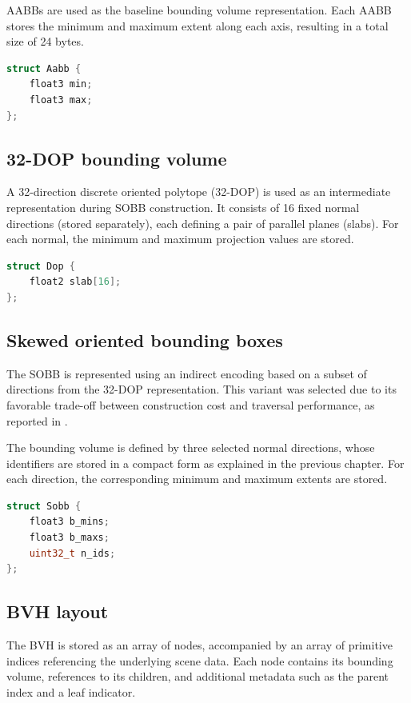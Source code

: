 AABBs are used as the baseline bounding volume representation. Each AABB stores the minimum and maximum extent along each axis, resulting in a total size of 24 bytes.

\begin{lstlisting}[language=C++, caption=AABB representation]
struct Aabb {
    float3 min;
    float3 max;
};
\end{lstlisting}

\subsection{32-DOP bounding volume}

A 32-direction discrete oriented polytope (32-DOP) is used as an intermediate representation during SOBB construction. It consists of 16 fixed normal directions (stored separately), each defining a pair of parallel planes (slabs). For each normal, the minimum and maximum projection values are stored.

\begin{lstlisting}[language=C++, caption=32-DOP representation]
struct Dop {
    float2 slab[16];
};
\end{lstlisting}

\subsection{Skewed oriented bounding boxes}

The SOBB is represented using an indirect encoding based on a subset of directions from the 32-DOP representation. This variant was selected due to its favorable trade-off between construction cost and traversal performance, as reported in \cite{KB24}.

The bounding volume is defined by three selected normal directions, whose identifiers are stored in a compact form as explained in the previous chapter. For each direction, the corresponding minimum and maximum extents are stored.

\begin{lstlisting}[language=C++, caption=SOBB representation]
struct Sobb {
    float3 b_mins;
    float3 b_maxs;
    uint32_t n_ids;
};
\end{lstlisting}

\subsection{BVH layout}

The BVH is stored as an array of nodes, accompanied by an array of primitive indices referencing the underlying scene data. Each node contains its bounding volume, references to its children, and additional metadata such as the parent index and a leaf indicator.


